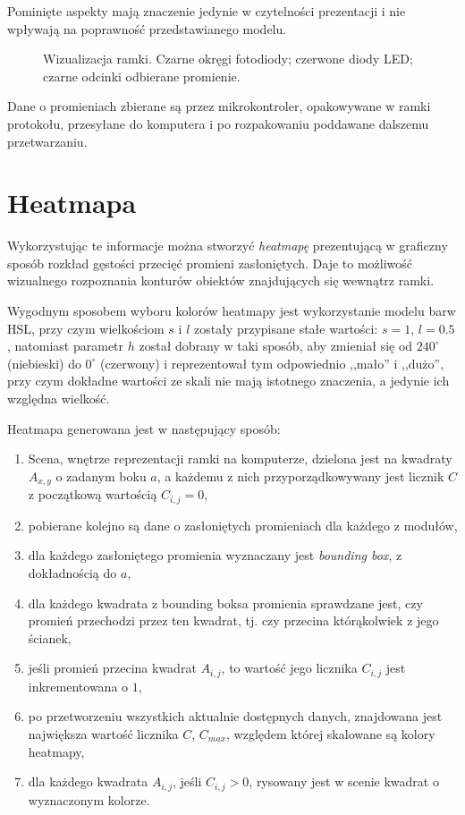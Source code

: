 Pominięte aspekty mają znaczenie jedynie w czytelności prezentacji i nie wpływają na poprawność przedstawianego modelu.

\begin{figure}
 \centering
 \makebox[\textwidth][r]{
  \resizebox{.9\largefigure}{!}{
    \def\svgwidth{0.9\largefigure}
    
  }
 }
 \caption{Wizualizacja ramki. Czarne okręgi \ppauza fotodiody; czerwone \ppauza diody LED; czarne odcinki \ppauza odbierane promienie.}
 \label{fig:scene_rays_sample}
\end{figure}

Dane o promieniach zbierane są przez mikrokontroler, opakowywane w ramki protokołu, przesyłane do komputera i po rozpakowaniu poddawane dalszemu przetwarzaniu.\\

\section{Heatmapa}

Wykorzystując te informacje można stworzyć \textit{heatmapę} prezentującą w graficzny sposób rozkład gęstości przecięć promieni zasłoniętych. Daje to możliwość wizualnego rozpoznania konturów obiektów znajdujących się wewnątrz ramki.

Wygodnym sposobem wyboru kolorów heatmapy jest wykorzystanie modelu barw HSL, przy czym wielkościom $s$ i $l$ zostały przypisane stałe wartości: $s = 1$, $l = 0.5$, natomiast parametr $h$ został dobrany w taki sposób, aby zmieniał się od $240^{\circ}$ (niebieski) do $0^{\circ}$ (czerwony) i reprezentował tym odpowiednio ,,mało'' i ,,dużo'', przy czym dokładne wartości ze skali nie mają istotnego znaczenia, a jedynie ich względna wielkość.

Heatmapa generowana jest w następujący sposób:
\begin{enumerate}
 \item Scena, wnętrze reprezentacji ramki na komputerze, dzielona jest na kwadraty $A_{x,y}$ o zadanym boku $a$, a każdemu z nich przyporządkowywany jest licznik $C$ z początkową wartością $C_{i,j} = 0$,
 \item pobierane kolejno są dane o zasłoniętych promieniach dla każdego z modułów,
 \item dla każdego zasłoniętego promienia wyznaczany jest \textit{bounding box}, z dokładnością do $a$,
 \item dla każdego kwadrata z bounding boksa promienia sprawdzane jest, czy promień przechodzi przez ten kwadrat, tj. czy przecina którąkolwiek z jego ścianek,
 \item jeśli promień przecina kwadrat $A_{i,j}$, to wartość jego licznika $C_{i,j}$ jest inkrementowana o $1$,
 \item po przetworzeniu wszystkich aktualnie dostępnych danych, znajdowana jest największa wartość licznika $C$, $C_{max}$, względem której skalowane są kolory heatmapy,
 \item dla każdego kwadrata $A_{i,j}$, jeśli $C_{i,j} > 0$, rysowany jest w scenie kwadrat o wyznaczonym kolorze.
\end{enumerate}

